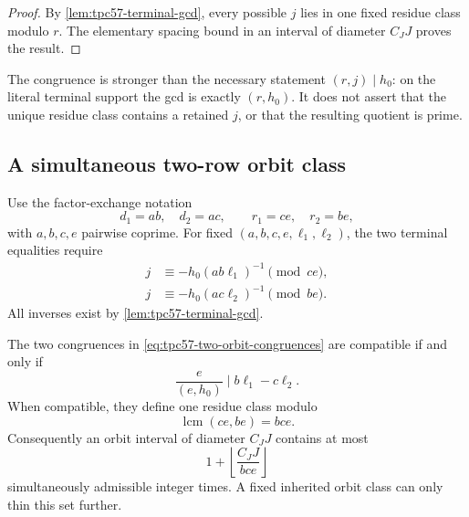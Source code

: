 \begin{proof}
By \cref{lem:tpc57-terminal-gcd}, every possible \(j\) lies in one fixed
residue class modulo \(r\).  The elementary spacing bound in an interval
of diameter \(C_JJ\) proves the result.
\end{proof}

The congruence is stronger than the necessary statement
\((r,j)\mid h_0\): on the literal terminal support the gcd is exactly
\((r,h_0)\).  It does not assert that the unique residue class contains a
retained \(j\), or that the resulting quotient is prime.

\subsection{A simultaneous two-row orbit class}

Use the factor-exchange notation
\[
 d_1=ab,\quad d_2=ac,
 \qquad r_1=ce,\quad r_2=be,
\]
with \(a,b,c,e\) pairwise coprime.  For fixed
\((a,b,c,e,\ell_1,\ell_2)\), the two terminal equalities require
\begin{equation}
 \begin{aligned}
 j&\equiv-h_0(ab\ell_1)^{-1}\pmod {ce},\\
 j&\equiv-h_0(ac\ell_2)^{-1}\pmod {be}.
 \end{aligned}
 \label{eq:tpc57-two-orbit-congruences}
\end{equation}
All inverses exist by \cref{lem:tpc57-terminal-gcd}.

\begin{proposition}
\label{prop:tpc57-joint-orbit-class}
The two congruences in
\eqref{eq:tpc57-two-orbit-congruences} are compatible if and only if
\begin{equation}
 \boxed{
 \frac e{(e,h_0)}\mid b\ell_1-c\ell_2.}
 \label{eq:tpc57-crt-compatibility}
\end{equation}
When compatible, they define one residue class modulo
\begin{equation}
 \operatorname{lcm}(ce,be)=bce.
 \label{eq:tpc57-joint-orbit-modulus}
\end{equation}
Consequently an orbit interval of diameter \(C_JJ\) contains at most
\begin{equation}
 1+\left\lfloor\frac{C_JJ}{bce}\right\rfloor
 \label{eq:tpc57-joint-orbit-count}
\end{equation}
simultaneously admissible integer times.  A fixed inherited orbit class
can only thin this set further.
\end{proposition}

